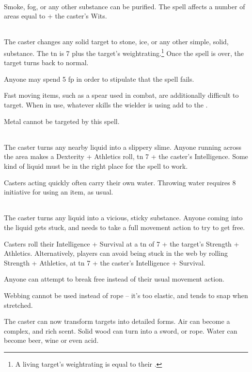 \begin{multicols}{2}
\\
Smoke, fog, or any other substance can be purified.  The spell affects a number of areas equal to  + the caster's Wits.

\\
The caster changes any solid target to stone, ice, or any other simple, solid, substance.  The \gls{tn} is 7 plus the target's \gls{weightrating}.\footnote{A living target's \gls{weightrating} is equal to their .}
Once the spell is over, the target turns back to normal.

Anyone may spend 5 \gls{fp} in order to stipulate that the spell fails.

Fast moving items, such as a spear used in combat, are additionally difficult to target.  When in use, whatever skills the wielder is using add to the .

Metal cannot be targeted by this spell.

\\
The caster turns any nearby liquid into a slippery slime.  Anyone running across the area makes a Dexterity + Athletics roll, \gls{tn} 7 + the caster's Intelligence.  Some kind of liquid must be in the right place for the spell to work.

Casters acting quickly often carry their own water.  Throwing water requires 8 initiative for using an item, as usual.

\\
The caster turns any liquid into a vicious, sticky substance.
Anyone coming into the liquid gets stuck, and needs to take a full movement action to try to get free.

Casters roll their Intelligence + Survival at a \gls{tn} of 7 + the target's Strength + Athletics. Alternatively, players can avoid being stuck in the web by rolling Strength + Athletics, at \gls{tn} 7 + the caster's Intelligence + Survival.

Anyone can attempt to break free instead of their usual movement action.

Webbing cannot be used instead of rope -- it's too elastic, and tends to snap when stretched.

The caster can now transform targets into detailed forms.  Air can become a complex, and rich scent.  Solid wood can turn into a sword, or rope.  Water can become beer, wine or even acid.


\end{multicols}
